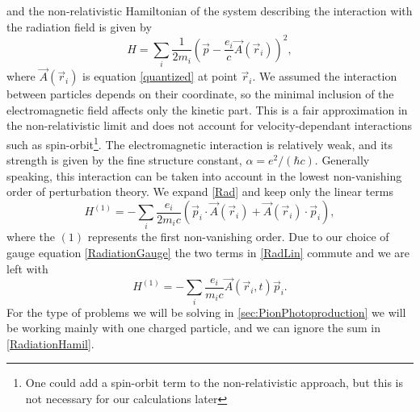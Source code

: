 and the non-relativistic Hamiltonian of the system describing the interaction with the radiation field is given by
\begin{equation} \label{Rad}
	H = \sum_i \frac{1}{2m_i}\left( \vec{p}-\frac{e_i}{c}\vec{A}(\vec{r}_i)\right)^2,
\end{equation}
where $\vec{A}(\vec{r}_i)$ is equation \eqref{quantized} at point $\vec{r}_i$. We assumed the interaction between particles depends on their coordinate, so the minimal inclusion of the electromagnetic field affects only the kinetic part. This is a fair approximation in the non-relativistic limit and does not account for velocity-dependant interactions such as spin-orbit\footnote{One could add a spin-orbit term to the non-relativistic approach, but this is not necessary for our calculations later}. 
The electromagnetic interaction is relatively weak, and its strength is given by the fine structure constant, $\alpha = e^2/(\hbar c)$. Generally speaking, this interaction can be taken into account in the lowest non-vanishing order of perturbation theory. We expand \eqref{Rad} and keep only the linear terms
\begin{equation} \label{RadLin}
	H^{(1)} = -\sum_i \frac{e_i}{2m_i c} (\vec{p}_i\cdot \vec{A}(\vec{r}_i)+\vec{A}(\vec{r}_i)\cdot \vec{p}_i),
\end{equation}
where the $(1)$ represents the first non-vanishing order. Due to our choice of gauge equation \eqref{RadiationGauge} the two terms in \eqref{RadLin} commute and we are left with
\begin{equation} \label{RadiationHamil}
	H^{(1)} = - \sum_i \frac{e_i}{m_i c} \vec{A}(\vec{r}_i,t)\vec{p}_i.
\end{equation}
For the type of problems we will be solving in \ref{sec:PionPhotoproduction} we will be working mainly with one charged particle, and we can ignore the sum in \eqref{RadiationHamil}.
